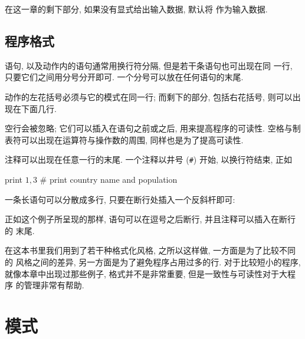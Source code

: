 在这一章的剩下部分, 如果没有显式给出输入数据, 默认将 
作为输入数据.

\subsection{程序格式}
\label{subsec:program_format}

\patact 语句, 以及动作内的语句通常用换行符分隔, 但是若干条语句也可出现在同
一行, 只要它们之间用分号分开即可. 一个分号可以放在任何语句的末尾.

动作的左花括号必须与它的模式在同一行; 而剩下的部分, 包括右花括号, 则可以出
现在下面几行.

空行会被忽略; 它们可以插入在语句之前或之后, 用来提高程序的可读性. 空格与制
表符可以出现在运算符与操作数的周围, 同样也是为了提高可读性.

注释可以出现在任意一行的末尾. 一个注释以井号 (\verb'#') 开始,
以换行符结束, 正如
\begin{awkcode}
    { print $1, $3 }    # print country name and population
\end{awkcode}

一条长语句可以分散成多行, 只要在断行处插入一个反斜杆即可:
正如这个例子所呈现的那样, 语句可以在逗号之后断行, 并且注释可以插入在断行的
末尾.

在这本书里我们用到了若干种格式化风格, 之所以这样做, 一方面是为了比较不同的
风格之间的差异, 另一方面是为了避免程序占用过多的行. 对于比较短小的程序,
就像本章中出现过那些例子, 格式并不是非常重要, 但是一致性与可读性对于大程序
的管理非常有帮助.

\section{模式}
\label{sec:patterns}

